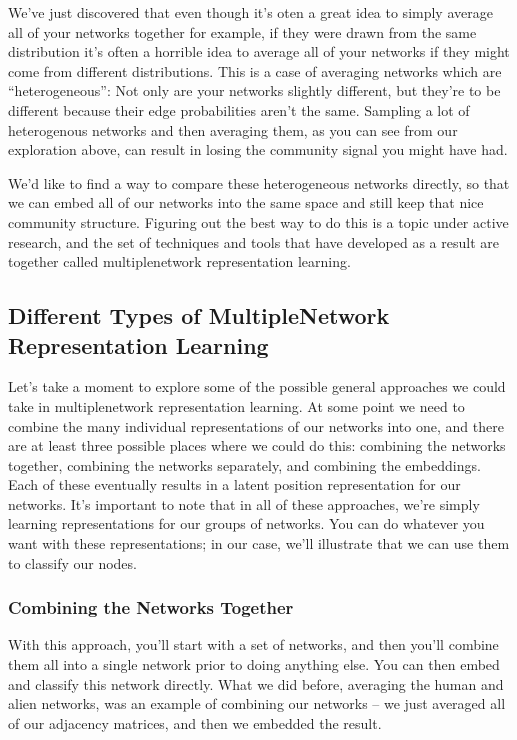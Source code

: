 \documentclass[letterpaper,10pt,english]{jupyterBook}
\begin{document}
\sphinxAtStartPar
We’ve just discovered that even though it’s oten a great idea to simply average all of your networks together \sphinxhyphen{} for example, if they were drawn from the same distribution \sphinxhyphen{} it’s often a horrible idea to average all of your networks if they might come from different distributions. This is a case of averaging networks which are “heterogeneous”: Not only are your networks slightly different, but they’re  to be different because their edge probabilities aren’t the same. Sampling a lot of heterogenous networks and then averaging them, as you can see from our exploration above, can result in losing the community signal you might have had.

\sphinxAtStartPar
We’d like to find a way to compare these heterogeneous networks directly, so that we can embed all of our networks into the same space and still keep that nice community structure. Figuring out the best way to do this is a topic under active research, and the set of techniques and tools that have developed as a result are together called multiple\sphinxhyphen{}network representation learning.


\subsection{Different Types of Multiple\sphinxhyphen{}Network Representation Learning}
\label{\detokenize{representations/ch6/multigraph-representation-learning:different-types-of-multiple-network-representation-learning}}
\sphinxAtStartPar
Let’s take a moment to explore some of the possible general approaches we could take in multiple\sphinxhyphen{}network representation learning. At some point we need to combine the many individual representations of our networks into one, and there are at least three possible places where we could do this: combining the networks together, combining the networks separately, and combining the embeddings. Each of these eventually results in a latent position representation for our networks. It’s important to note that in all of these approaches, we’re simply learning representations for our groups of networks. You can do whatever you want with these representations; in our case, we’ll illustrate that we can use them to classify our nodes.


\subsubsection{Combining the Networks Together}
\label{\detokenize{representations/ch6/multigraph-representation-learning:combining-the-networks-together}}
\sphinxAtStartPar
With this approach, you’ll start with a set of networks, and then you’ll combine them all into a single network prior to doing anything else. You can then embed and classify this network directly. What we did before, averaging the human and alien networks, was an example of combining our networks – we just averaged all of our adjacency matrices, and then we embedded the result.
\end{document}
